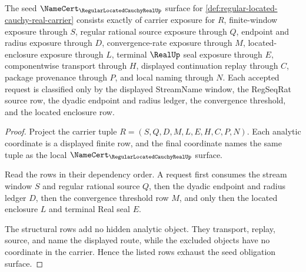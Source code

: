 \begin{theorem}
\label{thm:regular-located-cauchy-real-namecert-obligations}
The seed $\NameCert_{\RegularLocatedCauchyRealUp}$ surface for \autoref{def:regular-located-cauchy-real-carrier} consists exactly of carrier exposure for $R$, finite-window exposure through $S$, regular rational source exposure through $Q$, endpoint and radius exposure through $D$, convergence-rate exposure through $M$, located-enclosure exposure through $L$, terminal $\RealUp$ seal exposure through $E$, componentwise transport through $H$, displayed continuation replay through $C$, package provenance through $P$, and local naming through $N$. Each accepted request is classified only by the displayed StreamName window, the RegSeqRat source row, the dyadic endpoint and radius ledger, the convergence threshold, and the located enclosure row.
\end{theorem}
\begin{proof}
Project the carrier tuple $R=(S,Q,D,M,L,E,H,C,P,N)$. Each analytic coordinate is a displayed finite row, and the final coordinate names the same tuple as the local $\NameCert_{\RegularLocatedCauchyRealUp}$ surface.

Read the rows in their dependency order. A request first consumes the stream window $S$ and regular rational source $Q$, then the dyadic endpoint and radius ledger $D$, then the convergence threshold row $M$, and only then the located enclosure $L$ and terminal Real seal $E$.

The structural rows add no hidden analytic object. They transport, replay, source, and name the displayed route, while the excluded objects have no coordinate in the carrier. Hence the listed rows exhaust the seed obligation surface.
\end{proof}

